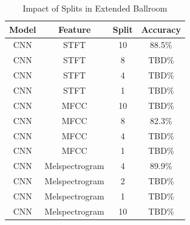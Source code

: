 \documentclass[10pt,twocolumn,letterpaper]{article}
\begin{document}
	\begin{table}[!htbp] %
		\caption{Impact of Splits in Extended Ballroom}
		\centering
		\begin{tabular}[b]{cccc}
			\hline \hline
			Model & Feature & Split & Accuracy 	\\ [0.5ex]
			\hline
			CNN & STFT &  10 & 88.5\%			\\
			CNN & STFT &  8 & TBD\%				\\
			CNN & STFT &  4 & TBD\%				\\
			CNN & STFT &  1 & TBD\%				\\
			CNN & MFCC &  10 & TBD\%			\\
			CNN & MFCC &  8 & 82.3\%			\\
			CNN & MFCC &  4 & TBD\%				\\
			CNN & MFCC &  1 & TBD\%				\\
			CNN & Melspectrogram & 4 & 89.9\% 	\\
			CNN & Melspectrogram & 2 & TBD\% 	\\
			CNN & Melspectrogram & 1 & TBD\% 	\\
			CNN & Melspectrogram & 10 & TBD\% 	\\ [1ex]
		\end{tabular}
	\label{table:splitsExtendedBallroom}
	\end{table}
	
	
	
		
	{\small
		
		
	}
	
\end{document}

